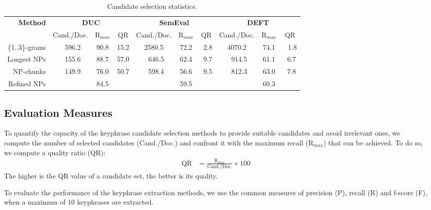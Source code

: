   \begin{table*}
    \centering
    \begin{tabular}{@{}r@{~~}c@{~}c@{~~}c@{~}c@{~}c@{~~}c@{~}c@{~}c@{~~}c@{}}
      \toprule
      \multirow{2}{*}[-2pt]{\textbf{Method}} & \multicolumn{3}{c}{\textbf{DUC}} & \multicolumn{3}{c}{\textbf{SemEval}} & \multicolumn{3}{c}{\textbf{DEFT}}\\
      \cmidrule(r){2-4}\cmidrule(r){5-7}\cmidrule{8-10}
      & Cand./Doc. & R$_{max}$ & QR & Cand./Doc. & R$_{max}$ & QR & Cand./Doc. & R$_{max}$ & QR\\
      \midrule
      \{1..3\}-grams & $~~~$596.2 & 90.8 & 15.2 & 2580.5 & 72.2 & $~~$2.8 & 4070.2 & 74.1 & $~~~$1.8\\
      Longest NPs & $~~~$155.6 & 88.7 & 57.0 & $~~~$646.5 & 62.4 & $~~$9.7 & $~~~$914.5 & 61.1 & $~~$6.7\\
      NP-chunks & $~~~$149.9 & 76.0 & 50.7 & $~~~$598.4 & 56.6 & $~~$9.5 & $~~~$812.3 & 63.0 & $~~$7.8\\
      Refined NPs &  & 84.5 &  &  & 59.5 &  &  & 60.3 & \\
      \bottomrule
    \end{tabular}
    \caption{Candidate selection statistics.
             \label{tab:candidate_extraction_statistics}}
  \end{table*}

  \subsection{Evaluation Measures}
  \label{subsec:keyphrase_extraction_evaluation_measures}
    To quantify the capacity of the keyphrase candidate selection methods to
    provide suitable candidates and avoid irrelevant ones, we compute the
    number of selected candidates (Cand./Doc.) and confront it with the
    maximum recall (R$_{max}$) that can be achieved. To do so, we compute a
    quality ratio (QR):
    \begin{align}
      \text{QR} &= \frac{\text{R$_{max}$}}{\text{Cand./Doc.}} \times 100
    \end{align}
    The higher is the QR value of a candidate set, the better is its quality.

    To evaluate the performance of the keyphrase extraction methods, we use
    the common measures of precision (P), recall (R) and f-score (F), when a
    maximum of 10 keyphrases are extracted.

